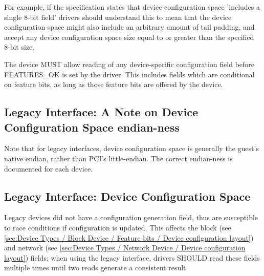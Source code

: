 \begin{note}
For example, if the specification states that device configuration
space 'includes a single 8-bit field' drivers should understand this to mean that
the device configuration space might also include an arbitrary amount of
tail padding, and accept any device configuration space size equal to or
greater than the specified 8-bit size.
\end{note}

The device MUST allow reading of any device-specific configuration
field before FEATURES_OK is set by the driver.  This includes fields which are
conditional on feature bits, as long as those feature bits are offered
by the device.

\subsection{Legacy Interface: A Note on Device Configuration Space endian-ness}\label{sec:Basic Facilities of a Virtio Device / Device Configuration Space / Legacy Interface: A Note on Configuration Space endian-ness}

Note that for legacy interfaces, device configuration space is generally the
guest's native endian, rather than PCI's little-endian.
The correct endian-ness is documented for each device.

\subsection{Legacy Interface: Device Configuration Space}\label{sec:Basic Facilities of a Virtio Device / Device Configuration Space / Legacy Interface: Device Configuration Space}

Legacy devices did not have a configuration generation field, thus are
susceptible to race conditions if configuration is updated.  This
affects the block  (see \ref{sec:Device Types /
Block Device / Feature bits / Device configuration layout}) and
network  (see \ref{sec:Device Types / Network Device /
Device configuration layout}) fields;
when using the legacy interface, drivers SHOULD
read these fields multiple times until two reads generate a consistent
result.

